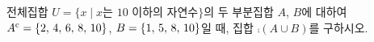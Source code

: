 전체집합 $U=\{x \mid x$는 $10$ 이하의 자연수$\}$의 두 부분집합 $A$, $B$에 대하여 ${A}^{\mathrm{c}}=\{2,\mkern3mu 4,\mkern3mu 6,\mkern3mu 8,\mkern3mu 10\}$, $B=\{1,\mkern3mu 5,\mkern3mu 8,\mkern3mu 10\}$일 때, 집합 $\comp{(A\cup B)}$를 구하시오.
